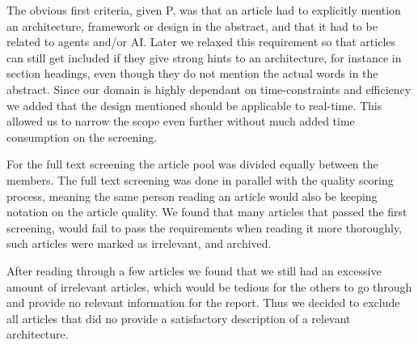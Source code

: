 The obvious first criteria, given P, was that an article had to explicitly mention an architecture, framework or design in the abstract, and that it had to be related to agents and/or AI. Later we relaxed this requirement so that articles can still get included if they give strong hints to an architecture, for instance in section headings, even though they do not mention the actual words in the abstract.
Since our domain is highly dependant on time-constraints and efficiency we added that the design mentioned should be applicable to real-time. This allowed us to narrow the scope even further without much added time consumption on the screening.

For the full text screening the article pool was divided equally between the members. The full text screening was done in parallel with the quality scoring process, meaning the same person reading an article would also be keeping notation on the article quality. 
We found that many articles that passed the first screening, would fail to pass the requirements when reading it more thoroughly, such articles were marked as irrelevant, and archived.

After reading through a few articles we found that we still had an excessive amount of irrelevant articles, which would be tedious for the others to go through and provide no relevant information for the report. Thus we decided to exclude all articles that did no provide a satisfactory description of a relevant architecture.


